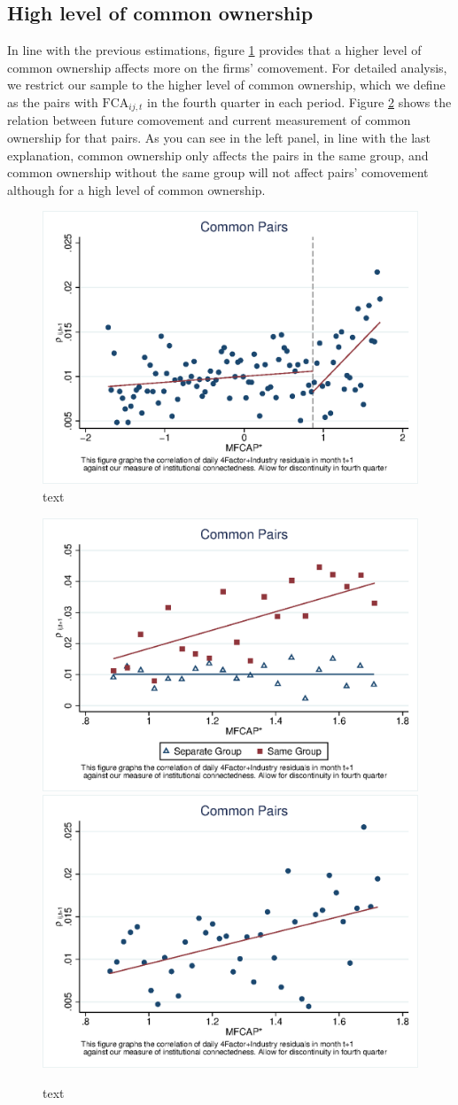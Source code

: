 \documentclass[12pt, a4paper]{article}
\begin{document}
\subsection{High level of common ownership}
In line with the previous estimations, figure \ref{Qmcorr5lrd} provides that a higher level of common ownership affects more on the firms' comovement. For detailed analysis, we restrict our sample to the higher level of common ownership, which we define as the pairs with $\text{FCA}_{ij,t}$ in the fourth quarter in each period. Figure \ref{Qmcorr5subsample} shows the relation between future comovement and current measurement of common ownership for that pairs. As you can see in the left panel, in line with the last explanation, common ownership only affects the pairs in the same group, and common ownership without the same group will not affect pairs' comovement although for a high level of common ownership.
\begin{figure}[htbp]
	\centering  
	\includegraphics[width=0.6\linewidth]{"Output/Qmcorr5lrd.eps"}
	\caption{text}
	\label{Qmcorr5lrd}
\end{figure}
\begin{figure}[htbp]
	\centering  
	\includegraphics[width=0.45\linewidth]{"Output/Qmcorr5lrdbgsubsample.eps"}
	\includegraphics[width=0.45\linewidth]{"Output/Qmcorr5subsample.eps"}
	\caption{text}
	\label{Qmcorr5subsample}
\end{figure}
\end{document}
